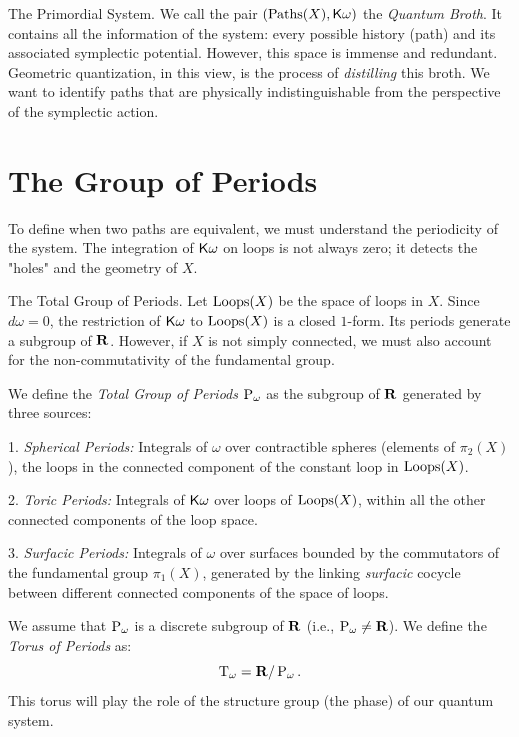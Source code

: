 \begin{Article}{The Primordial System.}{}
  We call the pair $(\operatorname{Paths}(X), \mathsf{K}\omega)$ the \emph{Quantum Broth}.
  It contains all the information of the system:
  every possible history (path) and its associated symplectic potential.
  However,
  this space is immense and redundant.
  Geometric quantization,
  in this view,
  is the process of \emph{distilling} this broth.
  We want to identify paths that are physically indistinguishable from the perspective of the symplectic action.
\end{Article}

\section{The Group of Periods}

To define when two paths are equivalent,
we must understand the periodicity of the system.
The integration of $\mathsf{K}\omega$ on loops is not always zero;
it detects the "holes" and the geometry of $X$.

\begin{Article}{The Total Group of Periods.}{}
  Let $\operatorname{Loops}(X)$ be the space of loops in $X$.
  Since $d\omega=0$,
  the restriction of $\mathsf{K}\omega$ to $\operatorname{Loops}(X)$ is a closed $1$-form.
  Its periods generate a subgroup of $\mathbf{R}$.
  However,
  if $X$ is not simply connected,
  we must also account for the non-commutativity of the fundamental group.

  We define the \emph{Total Group of Periods} $\operatorname{P}_\omega$ as the subgroup of $\mathbf{R}$ generated by three sources:

  1. \emph{Spherical Periods:} Integrals of $\omega$ over contractible spheres (elements of $\pi_2(X)$),
  the loops in the connected component of the constant loop in $\operatorname{Loops}(X)$.

  2. \emph{Toric Periods:} Integrals of $\mathsf{K}\omega$ over loops of $\operatorname{Loops}(X)$,
  within all the other connected components of the loop space.

  3. \emph{Surfacic Periods:} Integrals of $\omega$ over surfaces bounded by the commutators of the fundamental group $\pi_1(X)$,
  generated by the linking \emph{surfacic} cocycle between different connected components of the space of loops.

  We assume that $\operatorname{P}_\omega$ is a discrete subgroup of $\mathbf{R}$ (i.e., $\operatorname{P}_\omega \neq \mathbf{R}$).
  We define the \emph{Torus of Periods} as:
  $$%
    \Torus_\omega = \RR / \Periods_\omega.
  $$%
  This torus will play the role of the structure group (the phase) of our quantum system.
\end{Article}

